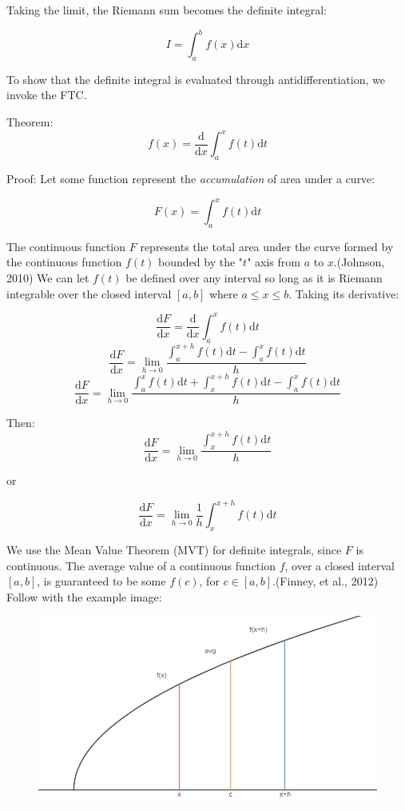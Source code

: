 \documentclass[11pt]{article}
\begin{document}
Taking the limit, the Riemann sum becomes the definite integral:

$$I = \int_{a}^{b}{f(x)\mathrm{d}x}$$

To show that the definite integral is evaluated through antidifferentiation, we invoke the FTC.

Theorem:
$$f(x) = \frac{\mathrm{d}}{\mathrm{d}x}\int_{a}^{x}{f(t)\mathrm{d}t}$$

Proof: Let some function represent the \textit{accumulation} of area under a curve:

$$F(x) = \int_{a}^{x}{f(t)\mathrm{d}t}$$

The continuous function $F$ represents the total area under the curve formed by the continuous function $f(t)$ bounded by the "$t$" axis from $a$ to $x$.(Johnson, 2010) We can let $f(t)$ be defined over any interval so long as it is Riemann integrable over the closed interval $[a,b]$ where $a\leq{x}\leq{b}$. Taking its derivative:

$$\frac{\mathrm{d}F}{\mathrm{d}x} = \frac{\mathrm{d}}{\mathrm{d}x}\int_{a}^{x}{f(t)\mathrm{d}t}$$
$$\frac{\mathrm{d}F}{\mathrm{d}x} = \lim_{h\to{0}}{\frac{\int_{a}^{x+h}{f(t)\mathrm{d}t}-\int_{a}^{x}{f(t)\mathrm{d}t}}{h}}$$
$$\frac{\mathrm{d}F}{\mathrm{d}x} = \lim_{h\to{0}}{\frac{\int_{a}^{x}{f(t)\mathrm{d}t}+\int_{x}^{x+h}{f(t)\mathrm{d}t}-\int_{a}^{x}{f(t)\mathrm{d}t}}{h}}$$

Then:
$$\frac{\mathrm{d}F}{\mathrm{d}x} = \lim_{h\to{0}}{\frac{\int_{x}^{x+h}{f(t)\mathrm{d}t}}{h}}$$
\begin{center}
or
\end{center}
$$\frac{\mathrm{d}F}{\mathrm{d}x} = \lim_{h\to{0}}{\frac{1}{h}\int_{x}^{x+h}{f(t)\mathrm{d}t}}$$

We use the Mean Value Theorem (MVT) for definite integrals, since $F$ is continuous. The average value of a continuous function $f$, over a closed interval $[a,b]$, is guaranteed to be some $f(c)$, for $c\in [a,b]$.(Finney, et al., 2012) Follow with the example image:

\begin{figure}[h]
\centering
\includegraphics[scale=0.5]{squeeze}
\end{figure}
\end{document}

